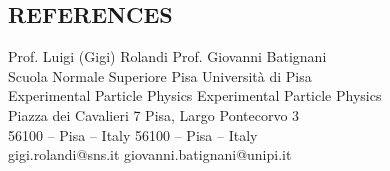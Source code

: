 \documentclass[margin, 10pt]{res} %
\begin{document}
\begin{resume}







\section{REFERENCES}

Prof. Luigi (Gigi) Rolandi \hfill Prof. Giovanni Batignani\\
Scuola Normale Superiore Pisa \hfill Università di Pisa\\
Experimental Particle Physics \hfill Experimental Particle Physics\\
Piazza dei Cavalieri 7 \hfill Pisa, Largo Pontecorvo  3\\
56100 – Pisa – Italy \hfill 56100 – Pisa – Italy\\
gigi.rolandi@sns.it \hfill giovanni.batignani@unipi.it\\


\end{resume}
\end{document}
